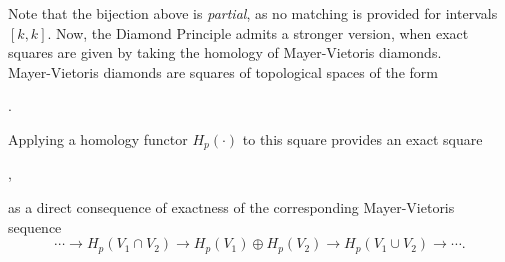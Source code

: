 \documentclass[11pt]{article}
\theoremstyle{remark}
\begin{document}
\noindent Note that the bijection above is \textit{partial}, as no matching is provided for intervals $[k,k]$. Now, the Diamond Principle admits a stronger version, when exact squares are given by taking the homology of Mayer-Vietoris diamonds.\\

\noindent Mayer-Vietoris diamonds are squares of topological spaces of the form 

\begin{center}
.
\end{center}

\noindent Applying a homology functor $H_p(\cdot)$ to this square provides an exact square 

\begin{center}
,
\end{center}
as a direct consequence of exactness of the corresponding Mayer-Vietoris sequence $$\cdots\longrightarrow H_p(V_1\cap V_2)\longrightarrow H_p(V_1)\oplus H_p(V_2) \longrightarrow H_p(V_1\cup V_2)\longrightarrow\cdots.$$
\end{document}
